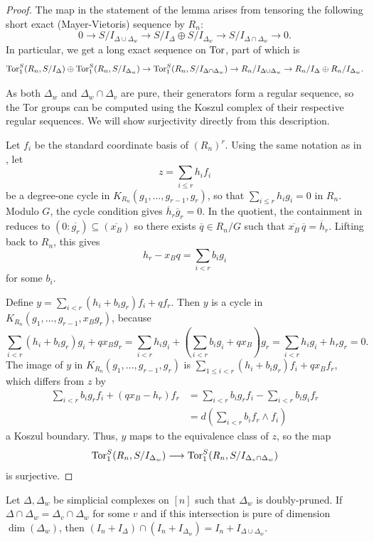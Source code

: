 \begin{proof}
The map in the statement of the lemma arises from tensoring the following short exact (Mayer-Vietoris) sequence by $R_n$:
    \[
    0\to S/I_{\Delta\cup\Delta_w}\to S/I_\Delta \oplus S/I_{\Delta_w}\to S/I_{\Delta\cap\Delta_w}\to 0.
    \]
    In particular, we get a long exact sequence on $\operatorname{Tor}$, part of which is
    \[
    \operatorname{Tor}_1^S(R_n,S/I_\Delta)\oplus \operatorname{Tor}_1^S(R_n,S/I_{\Delta_w})\to\operatorname{Tor}_1^S(R_n,S/I_{\Delta\cap\Delta_w})\to R_n/I_{\Delta\cup\Delta_w}\to R_n/I_\Delta \oplus R_n/I_{\Delta_w}.
    \]

As both $\Delta_w$ and $\Delta_w\cap \Delta_v$ are pure, their generators form a regular sequence, so the Tor groups can be computed using the Koszul complex of their respective regular sequences.
We will show surjectivity directly from this description.

Let $f_i$ be the standard coordinate basis of $(R_n)^r$. Using the same notation as in , let
\[z=\sum_{i\leq r}h_i f_i\]
be a degree-one cycle in $K_{R_n}(g_1,\ldots,g_{r-1},g_r)$, so that $\sum_{i\leq r}h_i g_i=0$ in $R_n$.
Modulo $G$, the cycle condition gives $\overline h_r \overline g_r=0$.
In the quotient, the containment in  reduces to $(0:\overline{g_r}) \subseteq (\overline{x_B})$ so there exists $\overline q\in R_n/G$ such that $\overline{x_B} \,\overline{q}=\overline h_r$.
Lifting back to $R_n$, this gives
\[h_r-x_Bq=\sum_{i<r}b_i g_i \] for some $b_i$.

Define $y=\sum_{i<r}(h_i+b_i g_r)f_i+qf_r$.
Then $y$ is a cycle in $K_{R_n}(g_1,\dots, g_{r-1},x_Bg_r)$, because
\[ \sum_{i<r}(h_i+b_i g_r)g_i+qx_Bg_r = \sum_{i<r}h_ig_i+\left(\sum_{i<r}b_i g_i+qx_B\right)g_r=\sum_{i<r}h_i g_i+h_rg_r=0. \]
The image of $y$ in $K_{R_n}(g_1,\ldots,g_{r-1},g_r)$ is $\sum_{1\leq i< r} (h_i+b_ig_r)f_i + qx_Bf_r$, which differs from $z$ by 
\begin{align*}
\sum_{i<r} b_ig_rf_i + (qx_B-h_r)f_r &= \sum_{i<r} b_ig_rf_i - \sum_{i<r} b_ig_i
f_r\\
&= d\left(\sum_{i<r} b_i f_r\wedge f_i\right)
\end{align*}
a Koszul boundary.
Thus, $y$ maps to the equivalence class of $z$, so the map
\[ \operatorname{Tor}_1^S(R_n,S/I_{\Delta_w})\longrightarrow\operatorname{Tor}_1^S(R_n,S/I_{\Delta_v\cap \Delta_w}) \]
is surjective.
\end{proof}


\begin{lemma}\label{lem:deal-int-DDw}
    Let $\Delta,\Delta_w$ be simplicial complexes on $[n]$ such that $\Delta_w$ is doubly-pruned. If $\Delta\cap\Delta_w = \Delta_v\cap \Delta_w$ for some $v$ and if this intersection is pure of dimension $\dim(\Delta_w)$, then $(I_n+I_\Delta)\cap (I_n +  I_{\Delta_w}) = I_n + I_{\Delta \cup\Delta_w}$.
\end{lemma}

